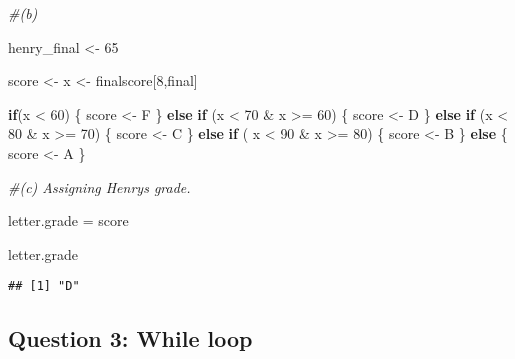\documentclass[
]{article}
\newenvironment{Shaded}{\begin{snugshade}}{\end{snugshade}}
\newcommand{\CommentTok}[1]{\textcolor[rgb]{0.56,0.35,0.01}{\textit{#1}}}
\newcommand{\ControlFlowTok}[1]{\textcolor[rgb]{0.13,0.29,0.53}{\textbf{#1}}}
\newcommand{\DecValTok}[1]{\textcolor[rgb]{0.00,0.00,0.81}{#1}}
\newcommand{\NormalTok}[1]{#1}
\newcommand{\OtherTok}[1]{\textcolor[rgb]{0.56,0.35,0.01}{#1}}
\newcommand{\SpecialCharTok}[1]{\textcolor[rgb]{0.00,0.00,0.00}{#1}}
\newcommand{\StringTok}[1]{\textcolor[rgb]{0.31,0.60,0.02}{#1}}
\begin{document}
\begin{Shaded}
\begin{Highlighting}[]
\CommentTok{\#(b)}

\NormalTok{henry\_final }\OtherTok{\textless{}{-}} \DecValTok{65}

\NormalTok{score }\OtherTok{\textless{}{-}} \StringTok{\textquotesingle{}\textquotesingle{}}
\NormalTok{x }\OtherTok{\textless{}{-}}\NormalTok{ finalscore[}\DecValTok{8}\NormalTok{,}\StringTok{\textquotesingle{}final\textquotesingle{}}\NormalTok{]}

\ControlFlowTok{if}\NormalTok{(x }\SpecialCharTok{\textless{}} \DecValTok{60}\NormalTok{) \{}
\NormalTok{  score }\OtherTok{\textless{}{-}} \StringTok{\textquotesingle{}F\textquotesingle{}}
\NormalTok{\} }\ControlFlowTok{else} \ControlFlowTok{if}\NormalTok{ (x }\SpecialCharTok{\textless{}} \DecValTok{70} \SpecialCharTok{\&}\NormalTok{ x }\SpecialCharTok{\textgreater{}=} \DecValTok{60}\NormalTok{) \{}
\NormalTok{  score }\OtherTok{\textless{}{-}} \StringTok{\textquotesingle{}D\textquotesingle{}}
\NormalTok{\} }\ControlFlowTok{else} \ControlFlowTok{if}\NormalTok{ (x }\SpecialCharTok{\textless{}} \DecValTok{80} \SpecialCharTok{\&}\NormalTok{ x }\SpecialCharTok{\textgreater{}=} \DecValTok{70}\NormalTok{) \{}
\NormalTok{  score }\OtherTok{\textless{}{-}} \StringTok{\textquotesingle{}C\textquotesingle{}}
\NormalTok{\} }\ControlFlowTok{else} \ControlFlowTok{if}\NormalTok{ ( x }\SpecialCharTok{\textless{}} \DecValTok{90} \SpecialCharTok{\&}\NormalTok{ x }\SpecialCharTok{\textgreater{}=} \DecValTok{80}\NormalTok{) \{}
\NormalTok{  score }\OtherTok{\textless{}{-}} \StringTok{\textquotesingle{}B\textquotesingle{}}
\NormalTok{\} }\ControlFlowTok{else}\NormalTok{ \{}
\NormalTok{  score }\OtherTok{\textless{}{-}} \StringTok{\textquotesingle{}A\textquotesingle{}}
\NormalTok{\}}





\CommentTok{\#(c) Assigning Henry\textquotesingle{}s grade.}

\NormalTok{letter.grade }\OtherTok{=}\NormalTok{ score}



\NormalTok{letter.grade}
\end{Highlighting}
\end{Shaded}

\begin{verbatim}
## [1] "D"
\end{verbatim}

\hypertarget{question-3-while-loop}{%
\subsection{Question 3: While loop}\label{question-3-while-loop}}
\end{document}
